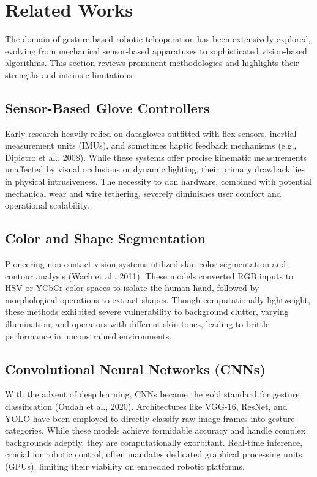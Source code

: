 \documentclass[conference]{IEEEtran}
\begin{document}
\section{Related Works}
The domain of gesture-based robotic teleoperation has been extensively explored, evolving from mechanical sensor-based apparatuses to sophisticated vision-based algorithms. This section reviews prominent methodologies and highlights their strengths and intrinsic limitations.

\subsection{Sensor-Based Glove Controllers}
Early research heavily relied on datagloves outfitted with flex sensors, inertial measurement units (IMUs), and sometimes haptic feedback mechanisms (e.g., Dipietro et al., 2008). While these systems offer precise kinematic measurements unaffected by visual occlusions or dynamic lighting, their primary drawback lies in physical intrusiveness. The necessity to don hardware, combined with potential mechanical wear and wire tethering, severely diminishes user comfort and operational scalability.

\subsection{Color and Shape Segmentation}
Pioneering non-contact vision systems utilized skin-color segmentation and contour analysis (Wach et al., 2011). These models converted RGB inputs to HSV or YCbCr color spaces to isolate the human hand, followed by morphological operations to extract shapes. Though computationally lightweight, these methods exhibited severe vulnerability to background clutter, varying illumination, and operators with different skin tones, leading to brittle performance in unconstrained environments.

\subsection{Convolutional Neural Networks (CNNs)}
With the advent of deep learning, CNNs became the gold standard for gesture classification (Oudah et al., 2020). Architectures like VGG-16, ResNet, and YOLO have been employed to directly classify raw image frames into gesture categories. While these models achieve formidable accuracy and handle complex backgrounds adeptly, they are computationally exorbitant. Real-time inference, crucial for robotic control, often mandates dedicated graphical processing units (GPUs), limiting their viability on embedded robotic platforms.
\end{document}
